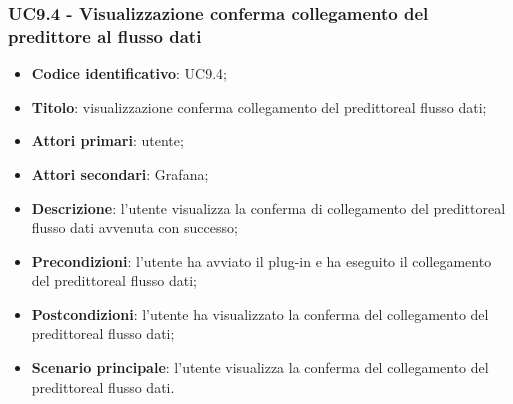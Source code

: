 \subsubsection{UC9.4 - Visualizzazione conferma collegamento del predittore al flusso dati}
\begin{itemize}
	\item \textbf{Codice identificativo}: UC9.4;
	\item \textbf{Titolo}: visualizzazione conferma collegamento del predittore\glosp al flusso dati;
	\item \textbf{Attori primari}: utente;
	\item \textbf{Attori secondari}: Grafana\glo;
	\item \textbf{Descrizione}: l'utente visualizza la conferma di collegamento del predittore\glosp al flusso dati avvenuta con successo;
	\item \textbf{Precondizioni}: l'utente ha avviato il plug-in e ha eseguito il collegamento del predittore\glosp al flusso dati;
	\item \textbf{Postcondizioni}: l'utente ha visualizzato la conferma del collegamento del predittore\glosp al flusso dati;
	\item \textbf{Scenario principale}: l'utente visualizza la conferma del collegamento del predittore\glosp al flusso dati.
\end{itemize}